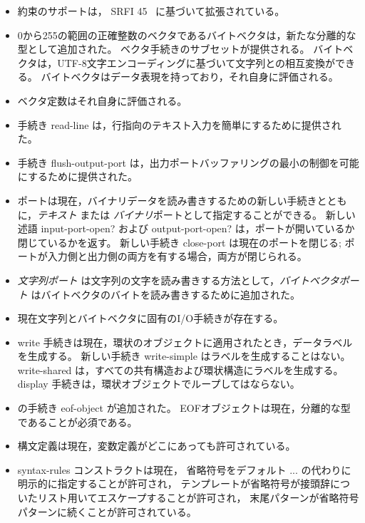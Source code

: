 \begin{itemize}
\item 約束のサポートは， SRFI 45~\cite{srfi45} に基づいて拡張されている。

\item 0から255の範囲の正確整数のベクタであるバイトベクタは，新たな分離的な型として追加された。
ベクタ手続きのサブセットが提供される。
バイトベクタは，UTF-8文字エンコーディングに基づいて文字列との相互変換ができる。
バイトベクタはデータ表現を持っており，それ自身に評価される。

\item ベクタ定数はそれ自身に評価される。

\item 手続き {\cf read-line} は，行指向のテキスト入力を簡単にするために提供された。

\item 手続き {\cf flush-output-port} は，出力ポートバッファリングの最小の制御を可能にするために提供された。

\item ポートは現在，バイナリデータを読み書きするための新しい手続きとともに，{\em テキスト} または {\em バイナリ}ポートとして指定することができる。
新しい述語 {\cf input-port-open?} および {\cf output-port-open?} は，ポートが開いているか閉じているかを返す。
新しい手続き {\cf close-port} は現在のポートを閉じる; ポートが入力側と出力側の両方を有する場合，両方が閉じられる。

\item {\em 文字列ポート} は文字列の文字を読み書きする方法として，{\em バイトベクタポート} はバイトベクタのバイトを読み書きするために追加された。

\item 現在文字列とバイトベクタに固有のI/O手続きが存在する。

\item {\cf write} 手続きは現在，環状のオブジェクトに適用されたとき，データラベルを生成する。
新しい手続き {\cf write-simple} はラベルを生成することはない。
{\cf write-shared} は，すべての共有構造および環状構造にラベルを生成する。
{\cf display} 手続きは，環状オブジェクトでループしてはならない。

\item \rsixrs の手続き {\cf eof-object} が追加された。
EOFオブジェクトは現在，分離的な型であることが必須である。

\item 構文定義は現在，変数定義がどこにあっても許可されている。

\item {\cf syntax-rules} コンストラクトは現在，
省略符号をデフォルト {\cf ...} の代わりに明示的に指定することが許可され，
テンプレートが省略符号が接頭辞についたリスト用いてエスケープすることが許可され，
末尾パターンが省略符号パターンに続くことが許可されている。


\end{itemize}
